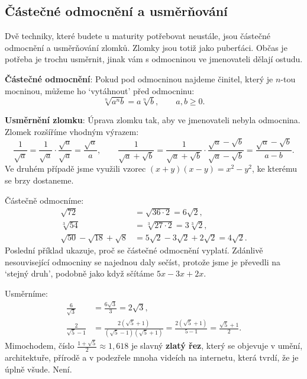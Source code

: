 \subsection{Částečné odmocnění a usměrňování}

Dvě techniky, které budete u maturity potřebovat neustále, jsou částečné odmocnění a usměrňování zlomků. Zlomky jsou totiž jako puberťáci. Občas je potřeba je trochu usměrnit, jinak vám s odmocninou ve jmenovateli dělají ostudu.

\begin{definitionbox}
  \textbf{Částečné odmocnění}: Pokud pod odmocninou najdeme činitel, který je $n$-tou mocninou, můžeme ho `vytáhnout' před odmocninu:
  \begin{equation*}
    \sqrt[n]{a^n b} = a\sqrt[n]{b}, \qquad a, b\geq 0.
  \end{equation*}

  \textbf{Usměrnění zlomku}: Úprava zlomku tak, aby ve jmenovateli nebyla odmocnina. Zlomek rozšíříme vhodným výrazem:
  \begin{equation*}
    \frac{1}{\sqrt{a}} = \frac{1}{\sqrt{a}}\cdot\frac{\sqrt{a}}{\sqrt{a}} = \frac{\sqrt{a}}{a}, \qquad
    \frac{1}{\sqrt{a} + \sqrt{b}} = \frac{1}{\sqrt{a} + \sqrt{b}}\cdot\frac{\sqrt{a} - \sqrt{b}}{\sqrt{a} - \sqrt{b}} = \frac{\sqrt{a} - \sqrt{b}}{a - b}.
  \end{equation*}
  Ve druhém případě jsme využili vzorec $(x + y)(x - y) = x^2 - y^2$, ke kterému se brzy dostaneme.
\end{definitionbox}

\begin{example}
  Částečně odmocníme:
  \begin{align*}
    \sqrt{72} &= \sqrt{36\cdot 2} = 6\sqrt{2},\\
    \sqrt[3]{54} &= \sqrt[3]{27\cdot 2} = 3\sqrt[3]{2},\\
    \sqrt{50} - \sqrt{18} + \sqrt{8} &= 5\sqrt{2} - 3\sqrt{2} + 2\sqrt{2} = 4\sqrt{2}.
  \end{align*}
  Poslední příklad ukazuje, proč se částečné odmocnění vyplatí. Zdánlivě nesouvisející odmocniny se najednou daly sečíst, protože jsme je převedli na `stejný druh', podobně jako když sčítáme $5x - 3x + 2x$.
\end{example}

\begin{example}
  Usměrníme:
  \begin{align*}
    \frac{6}{\sqrt{3}} &= \frac{6\sqrt{3}}{3} = 2\sqrt{3},\\
    \frac{2}{\sqrt{5} - 1} &= \frac{2(\sqrt{5} + 1)}{(\sqrt{5} - 1)(\sqrt{5} + 1)} = \frac{2(\sqrt{5} + 1)}{5 - 1} = \frac{\sqrt{5} + 1}{2}.
  \end{align*}
  Mimochodem, číslo $\frac{1 + \sqrt{5}}{2}\approx 1{,}618$ je slavný \textbf{zlatý řez}, který se objevuje v umění, architektuře, přírodě a v podezřele mnoha videích na internetu, která tvrdí, že je úplně všude. Není.
\end{example}

